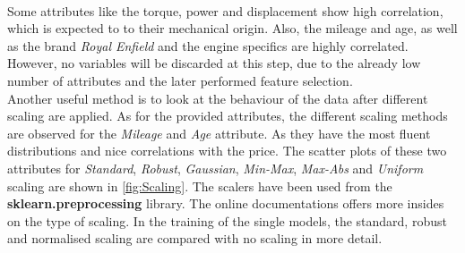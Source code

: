 \\Some attributes like the torque, power and displacement show high correlation, which is expected to to their mechanical origin.
Also, the mileage and age, as well as the brand \textit{Royal Enfield} and the engine specifics are highly correlated. However,
no variables will be discarded at this step, due to the already low number of attributes and the later performed feature selection.\\
Another useful method is to look at the behaviour of the data after different scaling are applied. As for the provided attributes,
the different scaling methods are observed for the \textit{Mileage} and \textit{Age} attribute. As they have the most fluent distributions
and nice correlations with the price. The scatter plots of these two attributes for \textit{Standard}, \textit{Robust}, \textit{Gaussian},
\textit{Min-Max}, \textit{Max-Abs} and \textit{Uniform} scaling are shown in \autoref{fig:Scaling}. The scalers have been used from 
the \textbf{sklearn.preprocessing}\cite{sklearn_preprocessing} library. The online documentations offers more insides on the type of scaling.
In the training of the single models, the standard, robust and normalised scaling are compared with no scaling in more detail.
